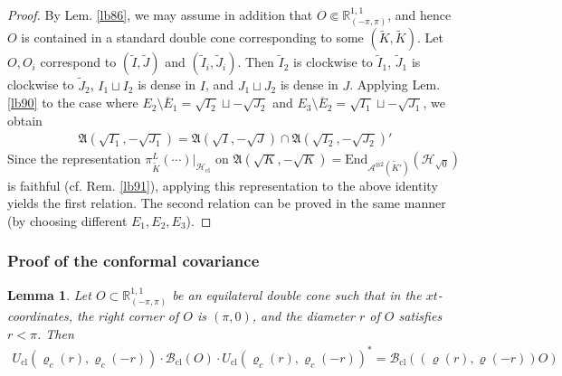 \documentclass[11pt,b5paper,notitlepage]{article}
\theoremstyle{definition}
\theoremstyle{plain}
\newtheorem{lm}[df]{Lemma}
\newcommand{\fk}{\mathfrak}
\newcommand{\wtd}{\widetilde}
\newcommand{\ovl}{\overline}
\newcommand{\End}{\mathrm{End}} %
\newcommand{\MH}{\mathcal H}
\newcommand{\Maa}{{\mathcal A^{\otimes 2}}}
\newcommand{\sqz}{{\sqrt 0}}
\newcommand{\Rpp}{\mathbb R^{1,1}_{(-\pi,\pi)}}
\newcommand{\Bcl}{\mathcal B_{\mathrm{cl}}}
\newcommand{\Hcl}{\mathcal H_{\mathrm{cl}}}
\newcommand{\Ucl}{U_{\mathrm{cl}}}
\numberwithin{equation}{section}
\begin{document}
\begin{proof}
By Lem. \ref{lb86}, we may assume in addition that $O\Subset\Rpp$, and hence $O$ is contained in a standard double cone corresponding to some $(\wtd K,\wtd K)$. Let $O,O_i$ correspond to $(\wtd I,\wtd J)$ and $(\wtd I_i,\wtd J_i)$. Then $\wtd I_2$ is clockwise to $\wtd I_1$, $\wtd J_1$ is clockwise to $\wtd J_2$, $I_1\sqcup I_2$ is dense in $I$, and $J_1\sqcup J_2$ is dense in $J$. Applying Lem. \ref{lb90} to the case where $E_2\setminus \ovl E_1=\sqrt{I_2}\sqcup -\sqrt{J_2}$ and $E_3\setminus \ovl E_2=\sqrt{I_1}\sqcup -\sqrt{J_1}$, we obtain
\begin{align*}
\fk A(\sqrt{I_1},-\sqrt{J_1})=\fk A(\sqrt I,-\sqrt J)\cap\fk A(\sqrt{I_2},-\sqrt{J_2})'
\end{align*}
Since the representation $\pi^L_{\wtd K}(\cdots)|_{\Hcl}$ on $\fk A(\sqrt K,-\sqrt K)=\End_{\Maa(\wtd K')}(\MH_\sqz)$ is faithful (cf. Rem. \ref{lb91}), applying this representation to the above identity yields the first relation. The second relation can be proved in the same manner (by choosing different $E_1,E_2,E_3$).
\end{proof}



\subsubsection{Proof of the conformal covariance}

\begin{lm}\label{lb94}
Let $O\subset\Rpp$ be an equilateral double cone such that in the $xt$-coordinates, the right corner of $O$ is $(\pi,0)$, and the diameter $r$ of $O$ satisfies $r<\pi$. Then
\begin{align*}
\Ucl(\varrho_c(r),\varrho_c(-r))\cdot\Bcl(O)\cdot\Ucl(\varrho_c(r),\varrho_c(-r))^*=\Bcl((\varrho(r),\varrho(-r))O)
\end{align*}
\end{lm}
\end{document}
